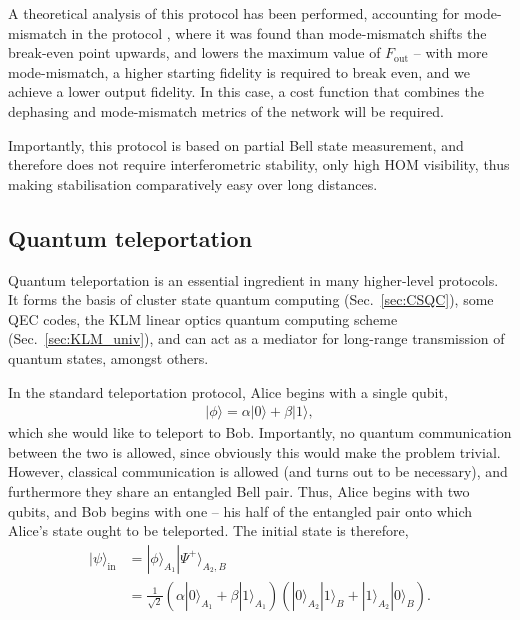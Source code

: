 \documentclass[aps,rmp,twocolumn,amsmath,amssymb,nofootinbib,superscriptaddress,longbibliography,floatfix]{revtex4-1}
\newcommand{\ket}[1]{|#1\rangle}
\begin{document}
A theoretical analysis of this protocol has been performed, accounting for mode-mismatch in the protocol \cite{bib:RohdeOptEntPur06}, where it was found than mode-mismatch shifts the break-even point upwards, and lowers the maximum value of $F_\mathrm{out}$ -- with more mode-mismatch, a higher starting fidelity is required to break even, and we achieve a lower output fidelity. In this case, a cost function that combines the dephasing and mode-mismatch metrics of the network will be required.

Importantly, this protocol is based on partial Bell state measurement, and therefore does not require interferometric stability, only high HOM visibility, thus making stabilisation comparatively easy over long distances.

%
%

\subsection{Quantum teleportation} \label{sec:teleport}

Quantum teleportation \cite{???} is an essential ingredient in many higher-level protocols. It forms the basis of cluster state quantum computing (Sec.~\ref{sec:CSQC}), some QEC codes, the KLM linear optics quantum computing scheme (Sec.~\ref{sec:KLM_univ}), and can act as a mediator for long-range transmission of quantum states, amongst others.

In the standard teleportation protocol, Alice begins with a single qubit,
\begin{align}
\ket\phi = \alpha\ket{0} +\beta\ket{1},
\end{align}
which she would like to teleport to Bob. Importantly, no quantum communication between the two is allowed, since obviously this would make the problem trivial. However, classical communication is allowed (and turns out to be necessary), and furthermore they share an entangled Bell pair. Thus, Alice begins with two qubits, and Bob begins with one -- his half of the entangled pair onto which Alice's state ought to be teleported. The initial state is therefore,
\begin{align}
\ket\psi_\mathrm{in} &= \ket{\phi}_{A_1} \ket{\Psi^+}_{A_2,B} \nonumber \\
&= \frac{1}{\sqrt{2}} (\alpha\ket{0}_{A_1}+\beta\ket{1}_{A_1}) (\ket{0}_{A_2}\ket{1}_B + \ket{1}_{A_2}\ket{0}_B).
\end{align}
\end{document}
